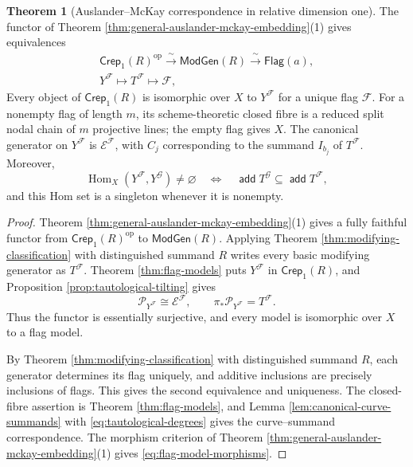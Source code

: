 \documentclass[a4paper,reqno]{amsart}
\def\E{\mathcal{E}}
\def\F{\mathcal{F}}
\def\P{\mathcal{P}}
\DeclareMathOperator{\add}{\mathsf{add}}
\DeclareMathOperator{\Hom}{Hom}
\DeclareMathOperator{\op}{op}
\theoremstyle{definition}
\newtheorem{Thm}{Theorem}[section]
\begin{document}
\begin{Thm}[Auslander--McKay correspondence in relative dimension one]\label{thm:auslander-mckay}
The functor of Theorem \ref{thm:general-auslander-mckay-embedding}(1) gives equivalences
\begin{equation}\label{eq:auslander-mckay}
\begin{gathered}
\mathsf{Crep}_1(R)^{\op}\xrightarrow{\ \sim\ }\mathsf{ModGen}(R)
\xrightarrow{\ \sim\ }\mathsf{Flag}(a),\\
Y^\F\longmapsto T^\F\longmapsto\F,
\end{gathered}
\end{equation}
Every object of $\mathsf{Crep}_1(R)$ is isomorphic over $X$ to $Y^\F$ for a unique flag $\F$. For a nonempty flag of length $m$, its scheme-theoretic closed fibre is a reduced split nodal chain of $m$ projective lines; the empty flag gives $X$. The canonical generator on $Y^\F$ is $\E^\F$, with $C_j$ corresponding to the summand $I_{b_j}$ of $T^\F$. Moreover,
\begin{equation}\label{eq:flag-model-morphisms}
\Hom_X(Y^\F,Y^{\mathcal G})\ne\varnothing
\quad\Longleftrightarrow\quad
\add T^{\mathcal G}\subseteq\add T^\F,
\end{equation}
and this Hom set is a singleton whenever it is nonempty.
\end{Thm}
\begin{proof}
Theorem \ref{thm:general-auslander-mckay-embedding}(1) gives a fully faithful functor from $\mathsf{Crep}_1(R)^{\op}$ to $\mathsf{ModGen}(R)$. Applying Theorem \ref{thm:modifying-classification} with distinguished summand $R$ writes every basic modifying generator as $T^\F$. Theorem \ref{thm:flag-models} puts $Y^\F$ in $\mathsf{Crep}_1(R)$, and Proposition \ref{prop:tautological-tilting} gives
\[
\P_{Y^\F}\cong\E^\F,\qquad \pi_*\P_{Y^\F}=T^\F.
\]
Thus the functor is essentially surjective, and every model is isomorphic over $X$ to a flag model.

By Theorem \ref{thm:modifying-classification} with distinguished summand $R$, each generator determines its flag uniquely, and additive inclusions are precisely inclusions of flags. This gives the second equivalence and uniqueness. The closed-fibre assertion is Theorem \ref{thm:flag-models}, and Lemma \ref{lem:canonical-curve-summands} with \eqref{eq:tautological-degrees} gives the curve--summand correspondence. The morphism criterion of Theorem \ref{thm:general-auslander-mckay-embedding}(1) gives \eqref{eq:flag-model-morphisms}.
\end{proof}
\end{document}
